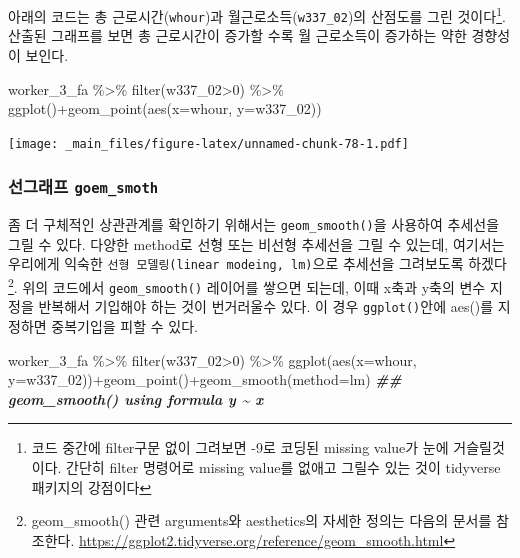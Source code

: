 \documentclass[
]{book}
\newenvironment{Shaded}{\begin{snugshade}}{\end{snugshade}}
\newcommand{\AttributeTok}[1]{\textcolor[rgb]{0.77,0.63,0.00}{#1}}
\newcommand{\DecValTok}[1]{\textcolor[rgb]{0.00,0.00,0.81}{#1}}
\newcommand{\DocumentationTok}[1]{\textcolor[rgb]{0.56,0.35,0.01}{\textbf{\textit{#1}}}}
\newcommand{\FunctionTok}[1]{\textcolor[rgb]{0.00,0.00,0.00}{#1}}
\newcommand{\NormalTok}[1]{#1}
\newcommand{\SpecialCharTok}[1]{\textcolor[rgb]{0.00,0.00,0.00}{#1}}
\newcommand{\StringTok}[1]{\textcolor[rgb]{0.31,0.60,0.02}{#1}}
\theoremstyle{definition}
\theoremstyle{definition}
\theoremstyle{definition}
\theoremstyle{definition}
\theoremstyle{remark}
\begin{document}
아래의 코드는 총 근로시간(\texttt{whour})과 월근로소득(\texttt{w337\_02})의 산점도를 그린 것이다\footnote{코드 중간에 filter구문 없이 그려보면 -9로 코딩된 missing value가 눈에 거슬릴것이다. 간단히 filter 명령어로 missing value를 없애고 그릴수 있는 것이 tidyverse 패키지의 강점이다}. 산출된 그래프를 보면 총 근로시간이 증가할 수록 월 근로소득이 증가하는 약한 경향성이 보인다.

\begin{Shaded}
\begin{Highlighting}[]
\NormalTok{worker\_3\_fa }\SpecialCharTok{\%\textgreater{}\%} 
  \FunctionTok{filter}\NormalTok{(w337\_02}\SpecialCharTok{\textgreater{}}\DecValTok{0}\NormalTok{) }\SpecialCharTok{\%\textgreater{}\%} 
  \FunctionTok{ggplot}\NormalTok{()}\SpecialCharTok{+}\FunctionTok{geom\_point}\NormalTok{(}\FunctionTok{aes}\NormalTok{(}\AttributeTok{x=}\NormalTok{whour, }\AttributeTok{y=}\NormalTok{w337\_02))}
\end{Highlighting}
\end{Shaded}

\texttt{[image: \_main\_files/figure-latex/unnamed-chunk-78-1.pdf]}

\hypertarget{uxc120uxadf8uxb798uxd504-goem_smoth}{%
\subsubsection{\texorpdfstring{선그래프 \texttt{goem\_smoth}}{선그래프 goem\_smoth}}\label{uxc120uxadf8uxb798uxd504-goem_smoth}}

좀 더 구체적인 상관관계를 확인하기 위해서는 \texttt{geom\_smooth()}을 사용하여 추세선을 그릴 수 있다. 다양한 method로 선형 또는 비선형 추세선을 그릴 수 있는데, 여기서는 우리에게 익숙한 \texttt{선형\ 모델링(linear\ modeing,\ lm)}으로 추세선을 그려보도록 하겠다\footnote{geom\_smooth() 관련 arguments와 aesthetics의 자세한 정의는 다음의 문서를 참조한다. \url{https://ggplot2.tidyverse.org/reference/geom_smooth.html}}. 위의 코드에서 \texttt{geom\_smooth()} 레이어를 쌓으면 되는데, 이때 x축과 y축의 변수 지정을 반복해서 기입해야 하는 것이 번거러울수 있다. 이 경우 \texttt{ggplot()}안에 aes()를 지정하면 중복기입을 피할 수 있다.

\begin{Shaded}
\begin{Highlighting}[]
\NormalTok{worker\_3\_fa }\SpecialCharTok{\%\textgreater{}\%} 
  \FunctionTok{filter}\NormalTok{(w337\_02}\SpecialCharTok{\textgreater{}}\DecValTok{0}\NormalTok{) }\SpecialCharTok{\%\textgreater{}\%} 
  \FunctionTok{ggplot}\NormalTok{(}\FunctionTok{aes}\NormalTok{(}\AttributeTok{x=}\NormalTok{whour, }\AttributeTok{y=}\NormalTok{w337\_02))}\SpecialCharTok{+}\FunctionTok{geom\_point}\NormalTok{()}\SpecialCharTok{+}\FunctionTok{geom\_smooth}\NormalTok{(}\AttributeTok{method=}\StringTok{\textquotesingle{}lm\textquotesingle{}}\NormalTok{)}
\DocumentationTok{\#\# \textasciigrave{}geom\_smooth()\textasciigrave{} using formula \textquotesingle{}y \textasciitilde{} x\textquotesingle{}}
\end{Highlighting}
\end{Shaded}
\end{document}
